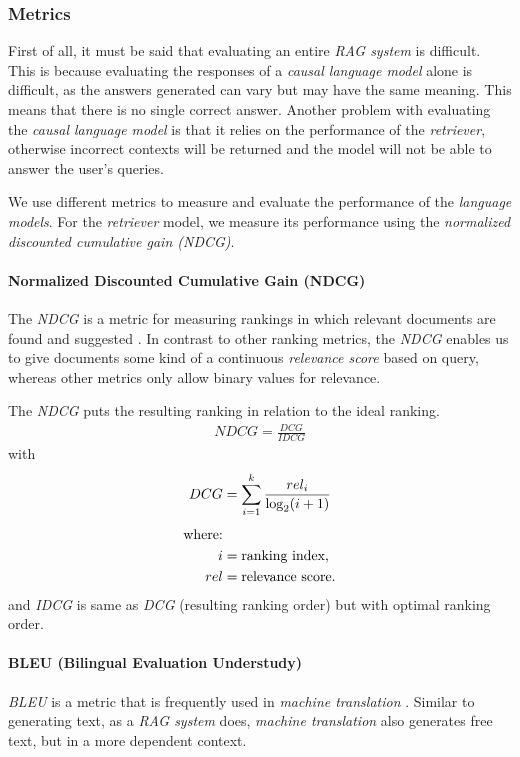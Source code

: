 \documentclass{article}
\begin{document}
\subsubsection{Metrics}\label{metrics}
First of all, it must be said that evaluating an entire \textit{RAG system} is difficult. This is because evaluating the responses of a \textit{causal language model} alone is difficult, as the answers generated can vary but may have the same meaning. This means that there is no single correct answer. Another problem with evaluating the \textit{causal language model }is that it relies on the performance of the \textit{retriever}, otherwise incorrect contexts will be returned and the model will not be able to answer the user's queries. 

We use different metrics to measure and evaluate the performance of the \textit{language models}. For the \textit{retriever} model, we measure its performance using the \textit{normalized discounted cumulative gain (NDCG)}.

\paragraph{Normalized Discounted Cumulative Gain (NDCG)}
The \textit{NDCG} is a metric for measuring rankings in which relevant documents are found and suggested \cite{NDCG}. In contrast to other ranking metrics, the \textit{NDCG} enables us to give documents some kind of a continuous \textit{relevance score} based on query, whereas other metrics only allow binary values for relevance.

The \textit{NDCG} puts the resulting ranking in relation to the ideal ranking.
\begin{align}
	 NDCG=\frac{DCG}{IDCG}
\end{align}
with
\begin{align*}
\begin{split}
	DCG&=\sum_{i=1}^{k}\frac{rel_{i}}{\log_{2}(i+1)}\\[0.25\baselineskip]
	\text{where:}\\
	i &= \text{ranking index,}\\ 
	rel &= \text{relevance score.}
\end{split}
\end{align*}
and \textit{IDCG} is same as \textit{DCG} (resulting ranking order) but with optimal ranking order.

\paragraph{BLEU (Bilingual Evaluation Understudy)} \textit{BLEU} is a metric that is frequently used in \textit{machine translation} \cite{BLEU}. Similar to generating text, as a \textit{RAG system} does, \textit{machine translation} also generates free text, but in a more dependent context.
\end{document}
